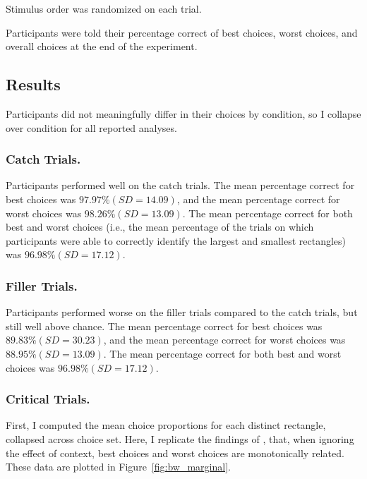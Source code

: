Stimulus order was randomized on each trial. 

Participants were told their percentage correct of best choices, worst choices, and overall choices at the end of the experiment.

\subsection{Results}

Participants did not meaningfully differ in their choices by condition, so I collapse over condition for all reported analyses.

\subsubsection{Catch Trials.}
Participants performed well on the catch trials. The mean percentage correct for best choices was $97.97\% (SD=14.09)$, and the mean percentage correct for worst choices was $98.26\% (SD=13.09)$. The mean percentage correct for both best and worst choices (i.e., the mean percentage of the trials on which participants were able to correctly identify the largest and smallest rectangles) was $96.98\% (SD=17.12)$. 

\subsubsection{Filler Trials.}
Participants performed worse on the filler trials compared to the catch trials, but still well above chance. The mean percentage correct for best choices was $89.83\% (SD=30.23)$, and the mean percentage correct for worst choices was $88.95\% (SD=13.09)$. The mean percentage correct for both best and worst choices was $96.98\% (SD=17.12)$. 

\subsubsection{Critical Trials.}

First, I computed the mean choice proportions for each distinct rectangle, collapsed across choice set. Here, I replicate the findings of \textcite{hawkinsBestTimesWorst2014}, that, when ignoring the effect of context, best choices and worst choices are monotonically related. These data are plotted in Figure~\ref{fig:bw_marginal}.

